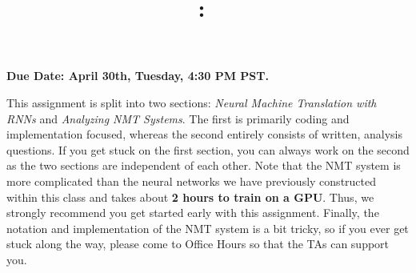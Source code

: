 \documentclass[answers]{exam}
\title{
\vspace{-1in}
\textmd{\textbf{\hmwkClass:\ \hmwkTitle} \\ \hmwkAuthorName}
}
\author{}
\date{}
\begin{document}
\maketitle
\vspace{-.5in}

\textbf{Due Date: April 30th, Tuesday, 4:30 PM PST.}


This assignment is split into two sections: \textit{Neural Machine Translation with RNNs} and \textit{Analyzing NMT Systems}. The first is primarily coding and implementation focused, whereas the second entirely consists of written, analysis questions. If you get stuck on the first section, you can always work on the second as the two sections are independent of each other. Note that the NMT system is more complicated than the neural networks we have previously constructed within this class and takes about \textbf{2 hours to train on a GPU}. Thus, we strongly recommend you get started early with this assignment. Finally, the notation and implementation of the NMT system is a bit tricky, so if you ever get stuck along the way, please come to Office Hours so that the TAs can support you. \newline

\begin{questions}
    
    
\end{questions}






\end{document}
